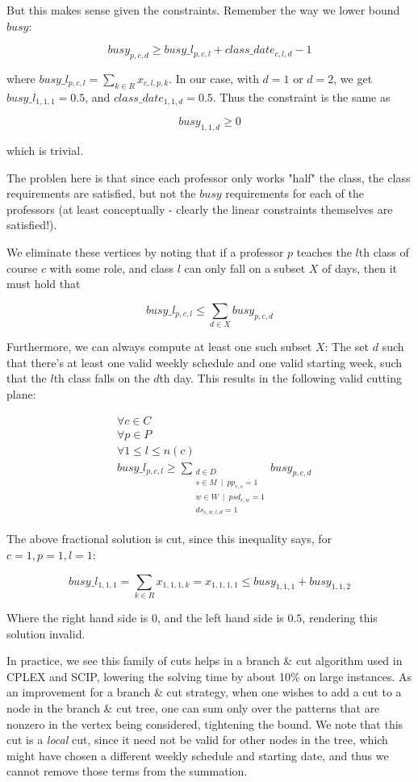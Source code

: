 But this makes sense given the constraints. Remember the way we lower bound $busy$:

$$
busy_{p, c, d} \ge busy\_l_{p, c, l} + class\_date_{c, l, d} - 1
$$

where $busy\_l_{p, c, l} = \sum_{k \in R} x_{c, l, p, k}$. In our case, with $d = 1$ or $d = 2$, we get $busy\_l_{1, 1, 1} = 0.5$, and $class\_date_{1, 1, d} = 0.5$. Thus the constraint is the same as

$$
busy_{1, 1, d} \ge 0
$$

which is trivial.

The problen here is that since each professor only works "half" the class, the class requirements are satisfied, but not the $busy$ requirements for each of the professors (at least conceptually - clearly the linear constraints themselves are satisfied!). 

We eliminate these vertices by noting that if a professor $p$ teaches the $l$th class of course $c$ with some role, and class $l$ can only fall on a subset $X$ of days, then it must hold that

$$
busy\_l_{p, c, l} \le \sum_{d \in X} busy_{p, c, d}
$$

Furthermore, we can always compute at least one such subset $X$: The set $d$ such that there's at least one valid weekly schedule and one valid starting week, such that the $l$th class falls on the $d$th day. This results in the following valid cutting plane:

\begin{align*}
&\forall c \in C\\
&\forall p \in P\\
&\forall 1 \le l \le n(c)\\
&busy\_l_{p, c, l} \ge \sum_{\substack{d \in D \\ s \in M\ \mid\ pp_{c, s} = 1\\ w \in W\ \mid\ psd_{c, w} = 1 \\ ds_{s, w, l, d} = 1}} busy_{p, c, d}
\end{align*}

The above fractional solution is cut, since this inequality says, for $c = 1, p = 1, l = 1$:

$$
busy\_l_{1, 1, 1} = \sum_{k \in R} x_{1, 1, 1, k} = x_{1, 1, 1, 1} \le busy_{1, 1, 1} + busy_{1, 1, 2}
$$

Where the right hand side is $0$, and the left hand side is $0.5$, rendering this solution invalid.

In practice, we see this family of cuts helps in a branch \& cut algorithm used in CPLEX and SCIP, lowering the solving time by about 10\% on large instances. As an improvement for a branch \& cut strategy, when one wishes to add a cut to a node in the branch \& cut tree, one can sum only over the patterns that are nonzero in the vertex being considered, tightening the bound. We note that this cut is a \emph{local} cut, since it need not be valid for other nodes in the tree, which might have chosen a different weekly schedule and starting date, and thus we cannot remove those terms from the summation.
